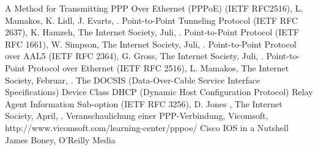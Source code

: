 \documentclass[journal,11pt]{IEEEtran}
\begin{document}
\appendices 
\ifCLASSOPTIONcaptionsoff 
  \newpage 
\fi
\begin{thebibliography}{1} 

 A Method for Transmitting PPP Over Ethernet (PPPoE) (IETF RFC2516), \newblock L. Mamakos, \newblock K. Lidl, \newblock J. Evarts, .
 Point-to-Point Tunneling Protocol (IETF RFC 2637), \newblock K. Hamzeh, \newblock The Internet Society, \newblock Juli, .
 Point-to-Point Protocol (IETF RFC 1661), \newblock W. Simpson, \newblock The Internet Society, \newblock Juli, .
 Point-to-Point Protocol over AAL5 (IETF RFC 2364), \newblock  G. Gross, \newblock The Internet Society, \newblock Juli, .
 Point-to-Point Protocol over Ethernet (IETF RFC 2516), \newblock  L. Mamakos, \newblock The Internet Society, \newblock Februar, .
 The DOCSIS (Data-Over-Cable Service Interface Specifications) Device Class DHCP (Dynamic Host Configuration Protocol) Relay Agent Information Sub-option (IETF RFC 3256), \newblock  D. Jones
, \newblock The Internet Society, \newblock April, .
 Veranschaulichung einer PPP-Verbindung, \newblock Vicomsoft, \newblock http://www.vicomsoft.com/learning-center/pppoe/
 Cisco IOS in a Nutshell \newblock James Boney, \newblock O'Reilly Media 

\end{thebibliography}
\end{document}
